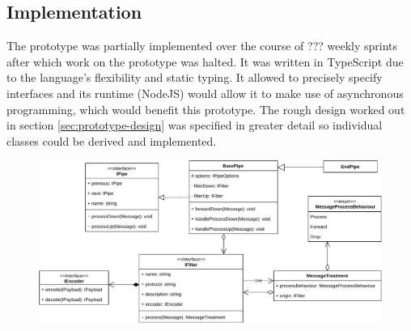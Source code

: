 \subsection{Implementation}
\label{sec:prototype-implementation}
The prototype was partially implemented over the course of ???%
weekly sprints after which work on the prototype was halted. It was written in TypeScript due to the language's flexibility and static typing. It allowed to precisely specify interfaces and its runtime (NodeJS) would allow it to make use of asynchronous programming, which would benefit this prototype. The rough design worked out in section \ref{sec:prototype-design} was specified in greater detail so individual classes could be derived and implemented.\par
\begin{figure}[h]
    \centering
    \includegraphics[width=14cm]{img/ch04/prototype/pipe-filter.pdf}
    \label{fig:prototype-pipe-filter}
\end{figure}
